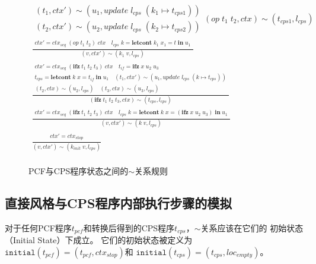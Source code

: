 \begin{figure}[htbp]
\begin{gather*}
{{\begin{matrix}
        (t_1, ctx')\sim (u_1, update\; l_{cps}\; (k_1 \mapsto t_{cps1})) \\
        (t_2, ctx')\sim (u_2, update\; l_{cps}\; (k_2 \mapsto t_{cps2})) \end{matrix}}
        {(op\; t_1\; t_2, ctx)\sim (t_{cps1}, l_{cps})}} \\
    \tag{6} \displaystyle{\frac{\begin{matrix}
        ctx'=ctx_{seq}\; (op\; t_1\; t_2)\; ctx \quad
        l_{cps}\; k = \mathbf{letcont}\; k_1\; x_1 = t\; \mathbf{in}\; u_1 \end{matrix}}
        {(v, ctx')\sim (k_1\; v, l_{cps})}} \\    
    \tag{7} \displaystyle{\frac{\begin{matrix}
        ctx'=ctx_{seq}\; (\mathbf{ ifz }\; t_1\; t_2\; t_3)\; ctx \quad
        t_{if} = \mathbf{ ifz }\; x\; u_2\; u_3 \\
        t_{cps} = \mathbf{letcont}\; k\; x = t_{if}\; \mathbf{in}\; u_1 \quad
        (t_1, ctx')\sim (u_1, update\; l_{cps}\; (k \mapsto t_{cps})) \\
        (t_2, ctx)\sim (u_2, l_{cps}) \quad (t_3, ctx)\sim (u_3, l_{cps}) \end{matrix}}
        {(\mathbf{ ifz }\; t_1\; t_2\; t_3, ctx)\sim (t_{cps}, l_{cps})}} \\
    \tag{8} \displaystyle{\frac{\begin{matrix}
        ctx'=ctx_{seq}\; (\mathbf{ ifz }\; t_1\; t_2\; t_3)\; ctx \quad
        l_{cps}\; k = \mathbf{letcont}\; k\; x = (\mathbf{ ifz }\; x\; u_2\; u_3)\; \mathbf{in}\; u_1 \end{matrix}}
        {(v, ctx')\sim (k\; v, l_{cps})}} \\
    \tag{9} \displaystyle{\frac{\begin{matrix}
        c t x' = ctx_{stop} \end{matrix}}
        {(v, ctx')\sim (k_{init}\; v, l_{cps})}} \\
    \end{gather*}
    \caption{PCF与CPS程序状态之间的$\sim$关系规则}\label{simrelationcps}
\end{figure}


\subsection{直接风格与CPS程序内部执行步骤的模拟}

对于任何PCF程序$t_{pcf}$和转换后得到的CPS程序$t_{cps}$，$\sim$关系应该在它们的
初始状态（Initial State）下成立。
它们的初始状态被定义为$\mathtt{initial}(t_{pcf}) = (t_{pcf}, ctx_{stop})$和
$\mathtt{initial}(t_{cps}) = (t_{cps}, loc_{empty})$。

